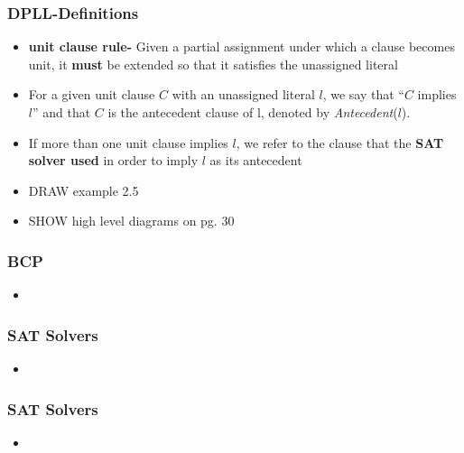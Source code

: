 \documentclass{beamer}
\begin{document}
\begin{frame}

 \frametitle{DPLL-Definitions}
 
 \begin{itemize}
 
   \item  \textbf{unit clause rule-} Given a partial assignment under which a clause becomes unit, it \textbf{must} be extended so that it satisfies the unassigned literal
   
  \item For a given unit clause \ensuremath{C} with an unassigned literal \ensuremath{l}, we say that ``\ensuremath{C} implies \ensuremath{l}'' and that \ensuremath{C} is the antecedent clause of l, denoted by \emph{Antecedent}(\ensuremath{l}).
 
 \item If more than one unit clause implies \ensuremath{l}, we refer to the clause that the \textbf{SAT solver used} in order to imply \ensuremath{l} as its antecedent
 \item DRAW example 2.5
 
 \item SHOW high level diagrams on pg. 30
 
 \end{itemize}
 
\end{frame}

\begin{frame}

 \frametitle{BCP}
 
 \begin{itemize}
 
 \item  
 
 \end{itemize}
 
\end{frame}

\begin{frame}

 \frametitle{SAT Solvers}
 
 \begin{itemize}
 
 \item  
 
 \end{itemize}
 
\end{frame}

\begin{frame}

 \frametitle{SAT Solvers}
 
 \begin{itemize}
 
 \item  
 
 \end{itemize}
 
\end{frame}
\end{document}
